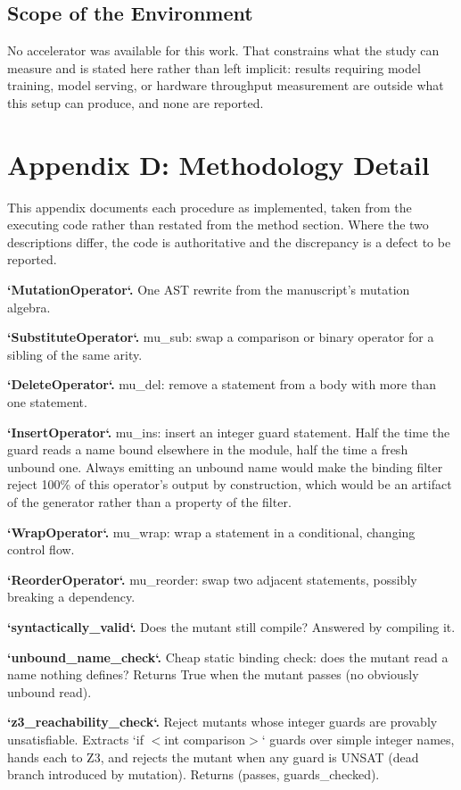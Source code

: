 \documentclass[10pt,journal,compsoc,twocolumn]{IEEEtran}
\begin{document}
\subsection{Scope of the Environment}


No accelerator was available for this work. That constrains what the study can measure and is stated here rather than left implicit: results requiring model training, model serving, or hardware throughput measurement are outside what this setup can produce, and none are reported.




\section{Appendix D: Methodology Detail}


This appendix documents each procedure as implemented, taken from the executing code rather than restated from the method section. Where the two descriptions differ, the code is authoritative and the discrepancy is a defect to be reported.

\textbf{`MutationOperator`.} One AST rewrite from the manuscript's mutation algebra.

\textbf{`SubstituteOperator`.} mu\_sub: swap a comparison or binary operator for a sibling of the same arity.

\textbf{`DeleteOperator`.} mu\_del: remove a statement from a body with more than one statement.

\textbf{`InsertOperator`.} mu\_ins: insert an integer guard statement. Half the time the guard reads a name bound elsewhere in the module, half the time a fresh unbound one. Always emitting an unbound name would make the binding filter reject 100\% of this operator's output by construction, which would be an artifact of the generator rather than a property of the filter.

\textbf{`WrapOperator`.} mu\_wrap: wrap a statement in a conditional, changing control flow.

\textbf{`ReorderOperator`.} mu\_reorder: swap two adjacent statements, possibly breaking a dependency.

\textbf{`syntactically\_valid`.} Does the mutant still compile? Answered by compiling it.

\textbf{`unbound\_name\_check`.} Cheap static binding check: does the mutant read a name nothing defines? Returns True when the mutant passes (no obviously unbound read).

\textbf{`z3\_reachability\_check`.} Reject mutants whose integer guards are provably unsatisfiable. Extracts `if $<$int comparison$>$` guards over simple integer names, hands each to Z3, and rejects the mutant when any guard is UNSAT (dead branch introduced by mutation). Returns (passes, guards\_checked).
\end{document}
